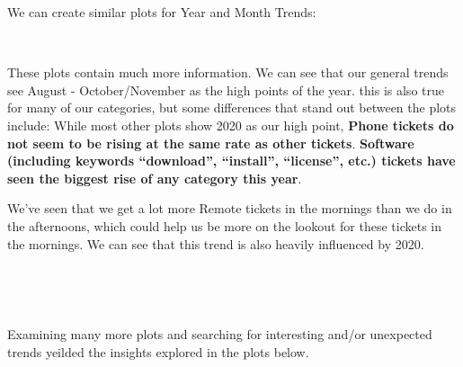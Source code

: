 \documentclass[11pt]{article}
\begin{document}
    We can create similar plots for Year and Month Trends:

\newpage

    \begin{center}

    \end{center}
    { \hspace*{\fill} \\}
    
    These plots contain much more information. We can see that our general
trends see August - October/November as the high points of the year.
this is also true for many of our categories, but some differences that
stand out between the plots include: While most other plots show 2020 as
our high point, \textbf{Phone tickets do not seem to be rising at the
same rate as other tickets}. \textbf{Software (including keywords
``download'', ``install'', ``license'', etc.) tickets have seen the
biggest rise of any category this year}.

    
    We've seen that we get a lot more Remote tickets in the mornings than we do in the
afternoons, which could help us be more on the lookout for these tickets
in the mornings. We can see that this trend is also heavily influenced
by 2020.

    \begin{center}
    \end{center}
    { \hspace*{\fill} \\}

    \begin{center}
    \end{center}
    { \hspace*{\fill} \\}
    
Examining many more plots and searching for interesting and/or unexpected
trends yeilded the insights explored in the plots below.

    \begin{center}
    \end{center}
    { \hspace*{\fill} \\}
    
\end{document}
